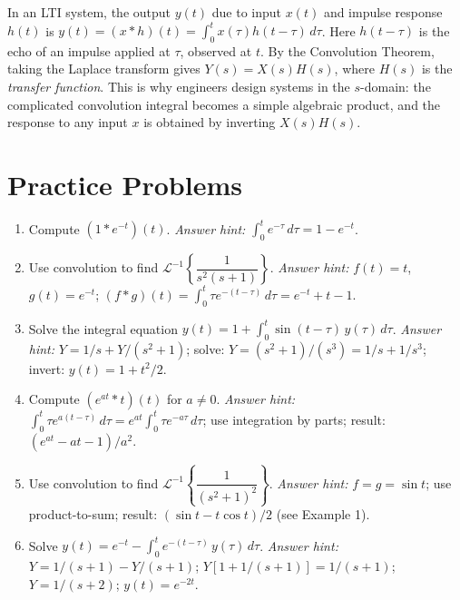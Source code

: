 \documentclass[12pt,a4paper]{article}
\begin{document}
\begin{enumerate}[label=\textbf{\arabic*.}, leftmargin=*, itemsep=10pt]
In an LTI system, the output $y(t)$ due to input $x(t)$ and impulse response
$h(t)$ is $y(t) = (x * h)(t) = \int_0^t x(\tau)h(t-\tau)\,d\tau$.
Here $h(t-\tau)$ is the echo of an impulse applied at $\tau$, observed at $t$.
By the Convolution Theorem, taking the Laplace transform gives $Y(s) = X(s)H(s)$,
where $H(s)$ is the \emph{transfer function}. This is why engineers design
systems in the $s$-domain: the complicated convolution integral becomes a
simple algebraic product, and the response to any input $x$ is obtained by
inverting $X(s)H(s)$.

\end{enumerate}

\section{Practice Problems}

\begin{enumerate}[label=\textbf{P\arabic*.}, leftmargin=*, itemsep=10pt]

\item Compute $(1 * e^{-t})(t)$.
\textit{Answer hint:} $\int_0^t e^{-\tau}\,d\tau = 1 - e^{-t}$.

\item Use convolution to find $\mathcal{L}^{-1}\!\left\{\dfrac{1}{s^2(s+1)}\right\}$.
\textit{Answer hint:} $f(t)=t$, $g(t)=e^{-t}$; $(f*g)(t)=\int_0^t\tau e^{-(t-\tau)}\,d\tau = e^{-t}+t-1$.

\item Solve the integral equation $y(t) = 1 + \int_0^t \sin(t-\tau)\,y(\tau)\,d\tau$.
\textit{Answer hint:} $Y = 1/s + Y/(s^2+1)$; solve: $Y = (s^2+1)/(s^3) = 1/s + 1/s^3$; invert: $y(t) = 1 + t^2/2$.

\item Compute $(e^{at} * t)(t)$ for $a \neq 0$.
\textit{Answer hint:} $\int_0^t\tau e^{a(t-\tau)}\,d\tau = e^{at}\int_0^t\tau e^{-a\tau}\,d\tau$;
use integration by parts; result: $(e^{at} - at - 1)/a^2$.

\item Use convolution to find $\mathcal{L}^{-1}\!\left\{\dfrac{1}{(s^2+1)^2}\right\}$.
\textit{Answer hint:} $f=g=\sin t$; use product-to-sum; result: $(\sin t - t\cos t)/2$ (see Example 1).

\item Solve $y(t) = e^{-t} - \int_0^t e^{-(t-\tau)}\,y(\tau)\,d\tau$.
\textit{Answer hint:} $Y = 1/(s+1) - Y/(s+1)$; $Y[1+1/(s+1)] = 1/(s+1)$; $Y = 1/(s+2)$; $y(t) = e^{-2t}$.

\end{enumerate}
\end{document}
